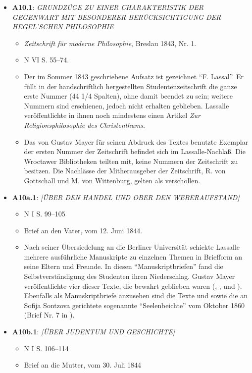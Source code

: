 \begin{itemize}
    \item \textbf{A10.1}: \textit{GRUNDZÜGE ZU EINER CHARAKTERISTIK DER GEGENWART MIT BESONDERER BERÜCKSICHTIGUNG DER HEGEL'SCHEN PHILOSOPHIE}
    \begin{itemize}
        \item \textit{Zeitschrift für moderne Philosophie}, Breslau 1843, Nr. 1.
        \item N VI S. 55--74.
        \item Der im Sommer 1843 geschriebene Aufsatz ist gezeichnet ``F. Lassal''. Er füllt in der handschriftlich hergestellten Studentenzeitschrift die ganze erste Nummer (44 1/4 Spalten), ohne damit beendet zu sein; weitere Nummern sind erschienen, jedoch nicht erhalten geblieben. Lassalle veröffentlichte in ihnen noch mindestens einen Artikel \textit{Zur Religionsphilosophie des Christenthums}.
        \item Das von Gustav Mayer für seinen Abdruck des Textes benutzte Exemplar der ersten Nummer der Zeitschrift befindet sich im Lassalle-Nachlaß. Die Wroctawer Bibliotheken teilten mit, keine Nummern der Zeitschrift zu besitzen. Die Nachlässe der Mitherausgeber der Zeitschrift, R. von Gottschall und M. von Wittenburg, gelten als verschollen.
    \end{itemize}
    
    \item \textbf{A10a.1}: \textit{[ÜBER DEN HANDEL UND OBER DEN WEBERAUFSTAND]}
    \begin{itemize}
        \item N I S. 99--105
        \item Brief an den Vater, vom 12. Juni 1844.
        \item Nach seiner Übersiedelung an die Berliner Universität schickte Lassalle mehrere ausführliche Manuskripte zu einzelnen Themen in Briefform an seine Eltern und Freunde. In diesen ``Manuskriptbriefen'' fand die Selbstverständigung des Studenten ihren Niederschlag. Gustav Mayer veröffentlichte vier dieser Texte, die bewahrt geblieben waren (, ,  und ). Ebenfalls als Manuskriptbriefe anzusehen sind die Texte  und  sowie die an Sofija Sontzova gerichtete sogenannte ``Seelenbeichte'' vom Oktober 1860 (Brief Nr. 7 in ).
    \end{itemize}
    
    \item \textbf{A10b.1}: \textit{[ÜBER JUDENTUM UND GESCHICHTE]}
    \begin{itemize}
        \item N I S. 106--114
        \item Brief an die Mutter, vom 30. Juli 1844
    \end{itemize}
    

\end{itemize}
